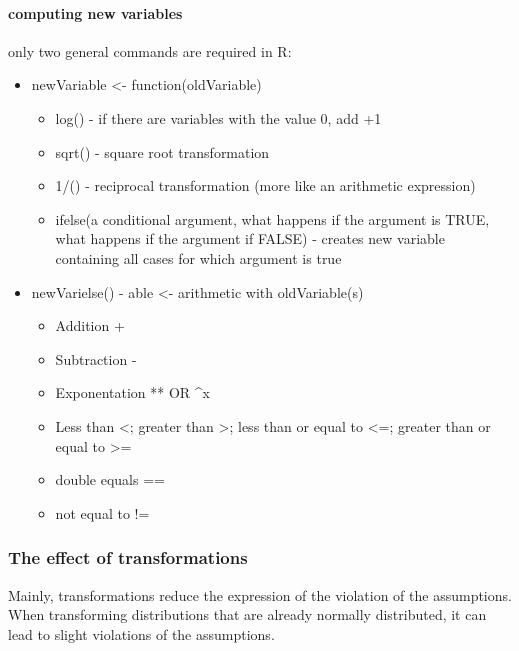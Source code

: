\documentclass[
]{article}
\begin{document}
\hypertarget{computing-new-variables}{%
\paragraph{computing new variables}\label{computing-new-variables}}

only two general commands are required in R:

\begin{itemize}
\item
  newVariable \textless- function(oldVariable)

  \begin{itemize}
  \item
    log() - if there are variables with the value 0, add +1
  \item
    sqrt() - square root transformation
  \item
    1/() - reciprocal transformation (more like an arithmetic
    expression)
  \item
    ifelse(a conditional argument, what happens if the argument is TRUE,
    what happens if the argument if FALSE) - creates new variable
    containing all cases for which argument is true
  \end{itemize}
\item
  newVarielse() - able \textless- arithmetic with oldVariable(s)

  \begin{itemize}
  \item
    Addition +
  \item
    Subtraction -
  \item
    Exponentation ** OR \^{}x
  \item
    Less than \textless; greater than \textgreater; less than or equal
    to \textless=; greater than or equal to \textgreater=
  \item
    double equals ==
  \item
    not equal to !=
  \end{itemize}
\end{itemize}

\hypertarget{the-effect-of-transformations}{%
\subsubsection{The effect of
transformations}\label{the-effect-of-transformations}}

Mainly, transformations reduce the expression of the violation of the
assumptions. When transforming distributions that are already normally
distributed, it can lead to slight violations of the assumptions.
\end{document}
